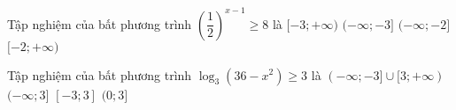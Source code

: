 \begin{ex}%
	Tập nghiệm của bất phương trình $\left(\dfrac{1}{2}\right)^{x-1}\ge 8$ là
	\choice
	{$[-3;+\infty)$}
	{$(-\infty;-3]$}
	{\True $(-\infty;-2]$}
	{$[-2;+\infty)$}
\end{ex}


\begin{ex}%
	Tập nghiệm của bất phương trình $\log_3 (36-x^2)\ge 3$ là
	\choice
	{$(-\infty;-3]\cup[3;+\infty)$}
	{$(-\infty;3]$}
	{\True $[-3;3]$}
	{$(0;3]$}
\end{ex}


